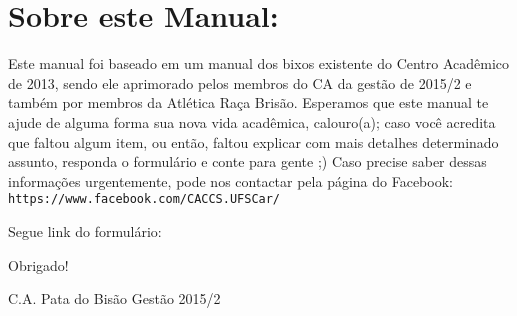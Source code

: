 \section{Sobre este Manual:}
Este manual foi baseado em um manual dos bixos existente do Centro Acadêmico de 2013, sendo ele aprimorado pelos membros do CA da gestão de 2015/2 e também por membros da Atlética Raça Brisão.
Esperamos que este manual te ajude de alguma forma sua nova vida acadêmica, calouro(a); caso você acredita que faltou algum item, ou então, faltou explicar com mais detalhes determinado assunto, responda o formulário e conte para gente ;) 
Caso precise saber dessas informações urgentemente, pode nos contactar pela página do Facebook: \texttt{https://www.facebook.com/CACCS.UFSCar/}

\begin{flushleft}
  Segue link do formulário: 
\end{flushleft}
\begin{flushright}
  Obrigado!\

  C.A. Pata do Bisão Gestão 2015/2
\end{flushright}
\newline{}

